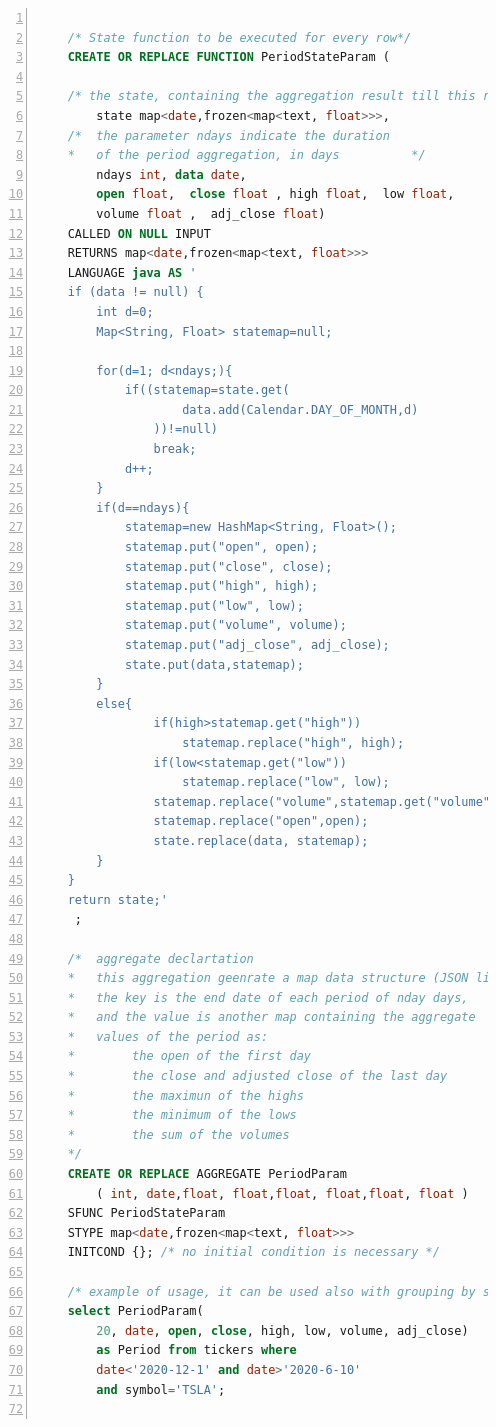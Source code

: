 \begin{lstlisting}[basicstyle=\footnotesize,language=SQL,numbers=left,
    numberstyle=\footnotesize,numbersep=4pt,frame=single]

    /* State function to be executed for every row*/
    CREATE OR REPLACE FUNCTION PeriodStateParam ( 

    /* the state, containing the aggregation result till this row */
        state map<date,frozen<map<text, float>>>,
    /*  the parameter ndays indicate the duration 
    *   of the period aggregation, in days          */
        ndays int, data date,  
        open float,  close float , high float,  low float, 
        volume float ,  adj_close float)
    CALLED ON NULL INPUT 
    RETURNS map<date,frozen<map<text, float>>> 
    LANGUAGE java AS '
    if (data != null) { 
        int d=0;
        Map<String, Float> statemap=null;
       
        for(d=1; d<ndays;){
            if((statemap=state.get(
                    data.add(Calendar.DAY_OF_MONTH,d)
                ))!=null)
                break;
            d++;
        }
        if(d==ndays){
            statemap=new HashMap<String, Float>();
            statemap.put("open", open);
            statemap.put("close", close);
            statemap.put("high", high);
            statemap.put("low", low);
            statemap.put("volume", volume);
            statemap.put("adj_close", adj_close);
            state.put(data,statemap);
        }
        else{
                if(high>statemap.get("high"))
                    statemap.replace("high", high);
                if(low<statemap.get("low"))
                    statemap.replace("low", low); 
                statemap.replace("volume",statemap.get("volume")+ volume);
                statemap.replace("open",open);
                state.replace(data, statemap); 
        }
    } 
    return state;'
     ;
    
    /*  aggregate declartation
    *   this aggregation geenrate a map data structure (JSON like):
    *   the key is the end date of each period of nday days, 
    *   and the value is another map containing the aggregate 
    *   values of the period as:
    *        the open of the first day
    *        the close and adjusted close of the last day
    *        the maximun of the highs
    *        the minimum of the lows
    *        the sum of the volumes
    */
    CREATE OR REPLACE AGGREGATE PeriodParam 
        ( int, date,float, float,float, float,float, float ) 
    SFUNC PeriodStateParam
    STYPE map<date,frozen<map<text, float>>>
    INITCOND {}; /* no initial condition is necessary */
    
    /* example of usage, it can be used also with grouping by symbol */
    select PeriodParam(
        20, date, open, close, high, low, volume, adj_close)
        as Period from tickers where 
        date<'2020-12-1' and date>'2020-6-10' 
        and symbol='TSLA';
    
\end{lstlisting}

